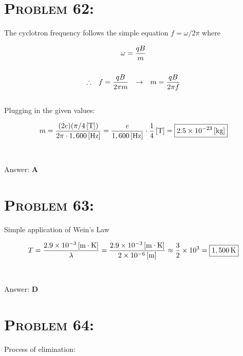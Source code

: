 \documentclass{article}
\providecommand{\e}[1]{\ensuremath{\times 10^{#1}}}
\begin{document}

\section{\textsc{Problem 62:}} The cyclotron frequency follows the simple equation $f = \omega/2 \pi$ where

\begin{gather}
\omega = \frac{qB}{ m}\\
\nonumber\\
\therefore \hspace{.1in}  f = \frac{qB}{2 \pi m}  \hspace{.1in} \rightarrow \hspace{.1in} m = \frac{q B }{2 \pi f}   \nonumber
\end{gather}
\\
Plugging in the given values:

\begin{gather}
m = \frac{(2 e) (\unit[\pi / 4]{[T]}) }{2 \pi \cdot \unit[1,600]{[Hz]}} = \frac{  e  }{ \unit[1,600]{[Hz]}} \cdot \unit[\frac{1}{4}]{[T]} = \boxed{\unit[2.5\e{-23}]{[kg]}}\nonumber
\end{gather}
\\\\
Answer: \textbf{\textcolor{ProcessBlue}A}\\


\section{\textsc{Problem 63:}} Simple application of Wein's Law

\begin{gather}
T = \frac{\unit[2.9\e{-3}]{[m \cdot K]}}{\lambda} = \frac{\unit[2.9\e{-3}]{[m \cdot K]}}{\unit[2\e{-6}]{[m]}} \approx \frac{3}{2} \e{3} =\boxed{\unit[1,500]{K}}
\end{gather}
\\\\
Answer: \textbf{\textcolor{ProcessBlue}D}\\


\section{\textsc{Problem 64:}} Process of elimination:
\end{document}
